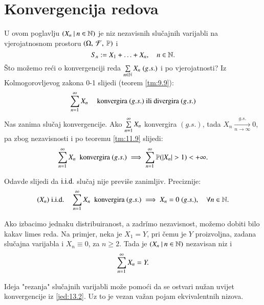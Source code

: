 
\chapter{Konvergencija redova}

U ovom poglavlju $({X_n} \: | \: {n \in \mathbb{N}})$ je niz nezavisnih slu\v cajnih varijabli na vjerojatnosnom prostoru $(\Omega, \: \mathcal{F}, \: \mathbb{P})$ i
\begin{equation*}
    S_n := X_1 + \ldots + X_n, \quad n \in \mathbb{N}.
\end{equation*}
\v Sto mo\v zemo re\' ci o konvergenciji reda $\sum\limits_{n \in \mathbb{N}}^{} X_n \; (g.s.)$ i po vjerojatnosti?
Iz Kolmogorovljevog zakona 0-1 slijedi (teorem \ref{tm:9.9}):
\begin{equation}    \label{jed:13.1}
    \sum\limits_{n = 1}^{\infty} X_n \quad \textnormal{ konvergira } (g.s.) \textnormal{ ili divergira } (g.s.)
\end{equation}
Nas zanima slu\v caj konvergencije.
Ako $\sum\limits_{n = 1}^{\infty} X_n$ konvergira $(g.s.)$, tada $X_n \xrightarrow[n \to \infty]{g.s.} 0$, pa zbog nezavisnosti i po teoremu \ref{tm:11.9} slijedi:
\begin{equation}    \label{jed:13.2}
    \sum\limits_{n = 1}^{\infty} X_n \; \textnormal{ konvergira } (g.s.) \implies \sum\limits_{n = 1}^{\infty} \mathbb{P}({|X_n| > 1}) < +\infty.
\end{equation}

Odavde slijedi da $\mathrm{i.i.d.}$ slu\v caj nije previ\v se zanimljiv.
Preciznije:
\begin{equation}    \label{jed:13.3}
    (X_n) \; \mathrm{i.i.d.} \quad \sum\limits_{n = 1}^{\infty} X_n \; \textnormal{ konvergira } (g.s.) \implies X_n = 0 \; (g.s.), \quad \forall n \in \mathbb{N}. 
\end{equation}

\begin{nap} \label{nap:13.4}
    Ako izbacimo jednaku distribuiranost, a zadr\v imo nezavisnost, mo\v zemo dobiti bilo kakav limes reda.
    Na primjer, neka je $X_1 = Y$, pri \v cemu je $Y$ proizvoljna, zadana slu\v cajna varijabla i $X_n \equiv 0$, za $n \geq 2$.
    Tada je $({X_n} \: | \: {n \in \mathbb{N}})$ nezavisan niz i
    \begin{equation*}
        \sum\limits_{n = 1}^{\infty} X_n = Y.
    \end{equation*}
\end{nap}

\begin{nap} \label{nap:13.5}
    Ideja "rezanja" slu\v cajnih varijabli mo\v ze pomo\' ci da se ostvari nu\v zan uvijet konvergencije iz \eqref{jed:13.2}.
    Uz to je vezan va\v zan pojam ekvivalentnih nizova.
\end{nap}


